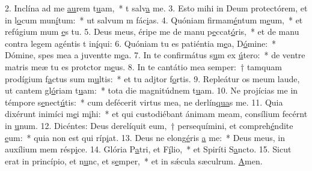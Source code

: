 2. Inclína ad me \uline{au}rem t\uline{u}am,~* t salv\uline{a} me.
3. Esto mihi in Deum protectórem, et in l\uline{o}cum mun\uline{í}tum:~* ut salvum m fác\uline{i}as.
4. Quóniam firmam\uline{é}ntum m\uline{e}um,~* et refúgium mum \uline{e}s tu.
5. Deus meus, éripe me de manu p\uline{e}ccat\uline{ó}ris,~* et de manu contra legem agéntis t in\uline{í}qui:
6. Quóniam tu es patiéntia m\uline{e}a, D\uline{ó}mine:~* Dómine, spes mea a juventte m\uline{e}a.
7. In te confirmátus s\uline{u}m ex \uline{ú}tero:~* de ventre matris meæ tu es protctor m\uline{e}us.
8. In te cantátio mea semper:~† tamquam prodígium f\uline{a}ctus sum m\uline{u}ltis:~* et tu adjtor f\uline{o}rtis.
9. Repleátur os meum laude, ut cantem gl\uline{ó}riam t\uline{u}am:~* tota die magnitúdnem t\uline{u}am.
10. Ne projícias me in témpore s\uline{e}nect\uline{ú}tis:~* cum defécerit virtus mea, ne derlín\uline{qua}s me.
11. Quia dixérunt inimíci m\uline{e}i m\uline{i}hi:~* et qui custodiébant ánimam meam, consílium fecérnt in \uline{u}num.
12. Dicéntes: Deus derelíquit eum,~† persequímini, et compreh\uline{é}ndite \uline{e}um:~* quia non est qui ríp\uline{i}at.
13. Deus ne elong\uline{é}ris \uline{a} me:~* Deus meus, in auxílium mem résp\uline{i}ce.
14. Glória P\uline{a}tri, et F\uline{í}lio,~* et Spiríti S\uline{a}ncto.
15. Sicut erat in princípio, et n\uline{u}nc, et s\uline{e}mper,~* et in sǽcula sæculrum. \uline{A}men.
